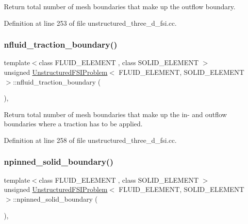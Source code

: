 Return total number of mesh boundaries that make up the outflow boundary. 



Definition at line 253 of file unstructured\+\_\+three\+\_\+d\+\_\+fsi.\+cc.

\mbox{\label{classUnstructuredFSIProblem_a476394046c343524eefff856715eb722}} 
\subsubsection{\texorpdfstring{nfluid\+\_\+traction\+\_\+boundary()}{nfluid\_traction\_boundary()}}
{\footnotesize\ttfamily template$<$class F\+L\+U\+I\+D\+\_\+\+E\+L\+E\+M\+E\+NT , class S\+O\+L\+I\+D\+\_\+\+E\+L\+E\+M\+E\+NT $>$ \\
unsigned \hyperlink{classUnstructuredFSIProblem}{Unstructured\+F\+S\+I\+Problem}$<$ F\+L\+U\+I\+D\+\_\+\+E\+L\+E\+M\+E\+NT, S\+O\+L\+I\+D\+\_\+\+E\+L\+E\+M\+E\+NT $>$\+::nfluid\+\_\+traction\+\_\+boundary (\begin{DoxyParamCaption}{ }\end{DoxyParamCaption})\hspace{0.3cm}{\ttfamily [inline]}, {\ttfamily [private]}}



Return total number of mesh boundaries that make up the in-\/ and outflow boundaries where a traction has to be applied. 



Definition at line 258 of file unstructured\+\_\+three\+\_\+d\+\_\+fsi.\+cc.

\mbox{\label{classUnstructuredFSIProblem_a221ed63d39e5377626e458b2c070541e}} 
\subsubsection{\texorpdfstring{npinned\+\_\+solid\+\_\+boundary()}{npinned\_solid\_boundary()}}
{\footnotesize\ttfamily template$<$class F\+L\+U\+I\+D\+\_\+\+E\+L\+E\+M\+E\+NT , class S\+O\+L\+I\+D\+\_\+\+E\+L\+E\+M\+E\+NT $>$ \\
unsigned \hyperlink{classUnstructuredFSIProblem}{Unstructured\+F\+S\+I\+Problem}$<$ F\+L\+U\+I\+D\+\_\+\+E\+L\+E\+M\+E\+NT, S\+O\+L\+I\+D\+\_\+\+E\+L\+E\+M\+E\+NT $>$\+::npinned\+\_\+solid\+\_\+boundary (\begin{DoxyParamCaption}{ }\end{DoxyParamCaption})\hspace{0.3cm}{\ttfamily [inline]}, {\ttfamily [private]}}



